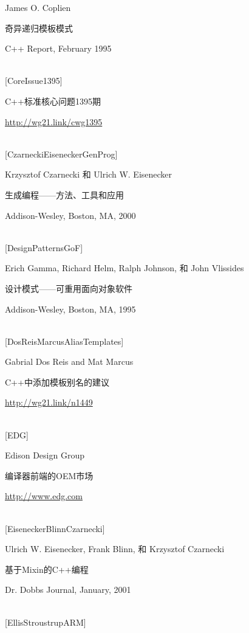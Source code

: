 James O. Coplien

奇异递归模板模式

C++ Report, February 1995

\hspace*{\fill} \\ %
{[CoreIssue1395]}

C++标准核心问题1395期

\url{http://wg21.link/cwg1395}

\hspace*{\fill} \\ %
{[CzarneckiEiseneckerGenProg]}

Krzysztof Czarnecki 和 Ulrich W. Eisenecker

生成编程——方法、工具和应用

Addison-Wesley, Boston, MA, 2000

\hspace*{\fill} \\ %
{[DesignPatternsGoF]}

Erich Gamma, Richard Helm, Ralph Johnson, 和 John Vlissides

设计模式——可重用面向对象软件

Addison-Wesley, Boston, MA, 1995

\hspace*{\fill} \\ %
{[DosReisMarcusAliasTemplates]}

Gabrial Dos Reis and Mat Marcus

C++中添加模板别名的建议

\url{http://wg21.link/n1449}

\hspace*{\fill} \\ %
{[EDG]}

Edison Design Group

编译器前端的OEM市场

\url{http://www.edg.com}

\hspace*{\fill} \\ %
{[EiseneckerBlinnCzarnecki]}

Ulrich W. Eisenecker, Frank Blinn, 和 Krzysztof Czarnecki

基于Mixin的C++编程

Dr. Dobbs Journal, January, 2001

\hspace*{\fill} \\ %
{[EllisStroustrupARM]}

